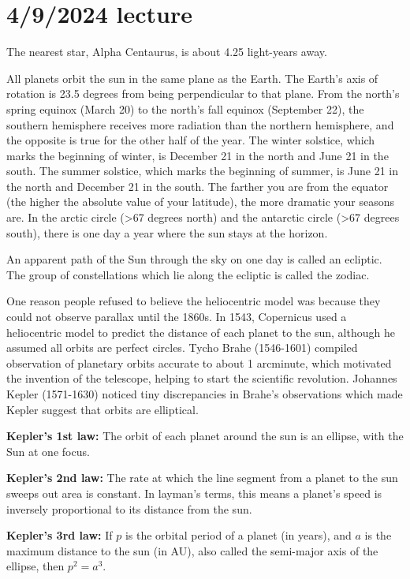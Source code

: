 \documentclass[class=article, crop=false]{standalone}
\begin{document}
\section{4/9/2024 lecture}
The nearest star, Alpha Centaurus, is about 4.25 light-years away.
\par
All planets orbit the sun in the same plane as the Earth. The Earth's axis of rotation is 23.5 degrees from being perpendicular to that plane. From the north's spring equinox (March 20) to the north's fall equinox (September 22), the southern hemisphere receives more radiation than the northern hemisphere, and the opposite is true for the other half of the year. The winter solstice, which marks the beginning of winter, is December 21 in the north and June 21 in the south. The summer solstice, which marks the beginning of summer, is June 21 in the north and December 21 in the south. The farther you are from the equator (the higher the absolute value of your latitude), the more dramatic your seasons are. In the arctic circle (>67 degrees north) and the antarctic circle (>67 degrees south), there is one day a year where the sun stays at the horizon.
\par
An apparent path of the Sun through the sky on one day is called an ecliptic. The group of constellations which lie along the ecliptic is called the zodiac.\par
One reason people refused to believe the heliocentric model was because they could not observe parallax until the 1860s. In 1543, Copernicus used a heliocentric model to predict the distance of each planet to the sun, although he assumed all orbits are perfect circles. Tycho Brahe (1546-1601) compiled observation of planetary orbits accurate to about 1 arcminute, which motivated the invention of the telescope, helping to start the scientific revolution. Johannes Kepler (1571-1630) noticed tiny discrepancies in Brahe's observations which made Kepler suggest that orbits are elliptical.
\par
\textbf{Kepler's 1st law:} The orbit of each planet around the sun is an ellipse, with the Sun at one focus.
\par
\textbf{Kepler's 2nd law:} The rate at which the line segment from a planet to the sun sweeps out area is constant. In layman's terms, this means a planet's speed is inversely proportional to its distance from the sun.
\par
\textbf{Kepler's 3rd law:} If $p$ is the orbital period of a planet (in years), and $a$ is the maximum distance to the sun (in AU), also called the semi-major axis of the ellipse, then $p^2=a^3$.
\end{document}
